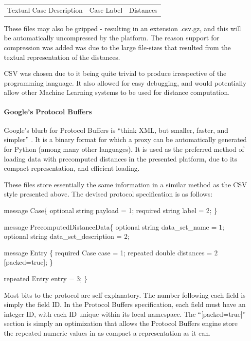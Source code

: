 \documentclass[a4paper,11pt]{report}
\begin{document}
\begin{tabular}{ |c| |c| |c| }
	Textual Case Description & Case Label & Distances \\
\end{tabular}

\medskip

These files may also be gzipped - resulting in an extension .csv.gz, and this will be automatically uncompressed by the platform. The reason support for compression was added was due to the large file-sizes that resulted from the textual representation of the distances.

CSV was chosen due to it being quite trivial to produce irrespective of the programming language. It also allowed for easy debugging, and would potentially allow other Machine Learning systems to be used for distance computation.

\paragraph{Google's Protocol Buffers \citep{prog:protocolbuffers}}

Google's blurb for Protocol Buffers is ``think XML, but smaller, faster, and simpler'' \citep{prog:protocolbuffers}. It is a binary format for which a proxy can be automatically generated for Python (among many other languages). It is used as the preferred method of loading data with precomputed distances in the presented platform, due to its compact representation, and efficient loading.

These files store essentially the same information in a similar method as the CSV style presented above. The devised protocol specification is as follows:
 
\begin{code}
message Case\{
    optional string payload = 1;
    required string label = 2;
\}

message PrecomputedDistanceData\{
  optional string data_set_name = 1;
  optional string data_set_description = 2;
  
  message Entry \{
    required Case case = 1;
    repeated double distances = 2 [packed=true];
  \}
  
  repeated Entry entry = 3;
\}
\end{code}


Most bits to the protocol are self explanatory. The number following each field is simply the field ID. In the Protocol Buffers specification, each field must have an integer ID, with each ID unique within its local namespace. The ``[packed=true]'' section is simply an optimization that allows the Protocol Buffers engine store the repeated numeric values in as compact a representation as it can.
\end{document}
